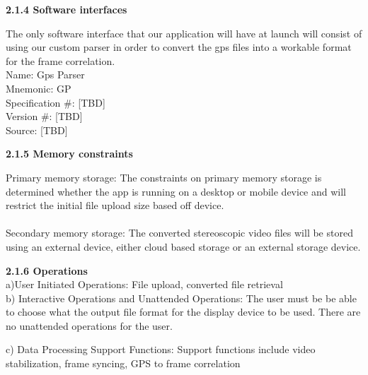 \documentclass[10pt,draftclsnofoot,onecolumn]{IEEEtran}
\begin{document}
{\Medium\textbf{2.1.4 Software interfaces}} \\

\vspace{5mm}

The only software interface that our application will have at launch will consist of using our custom parser in order to convert the gps files into a workable format for the frame correlation. \\
			Name: Gps Parser\\
			Mnemonic: GP\\
			Specification #: [TBD]\\
			Version #: [TBD]\\
			Source: [TBD]\\



\vspace{5mm}

{\Medium\textbf{2.1.5 Memory constraints}} \\
\vspace{5mm}

Primary memory storage: The constraints on primary memory storage is determined whether the app is running on a desktop or mobile device and will restrict the initial file upload size based off device. \\
\\
			Secondary memory storage: The converted stereoscopic video files will be stored using an external device, either cloud based storage or an external storage device.

\vspace{5mm}

{\Medium\textbf{2.1.6 Operations}} \\
\vspace{5mm}
a)User Initiated Operations: File upload, converted file retrieval\\
\vspace{2mm}
b) Interactive Operations and Unattended Operations: The user must be be able to choose what the output file format for the display device to be used. There are no unattended operations for the user.\\
\vspace{2mm}

c) Data Processing Support Functions: Support functions include video stabilization, frame syncing, GPS to frame correlation
	
\vspace{2mm}
\end{document}
